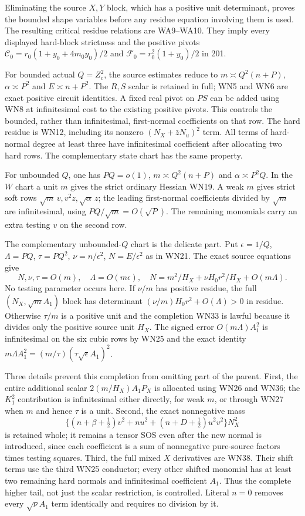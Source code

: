 Eliminating the source $X,Y$ block, which has a positive unit
determinant, proves the bounded shape variables before any residue
equation involving them is used.  The resulting critical residue
relations are WA9--WA10.  They imply every displayed hard-block
strictness and the positive pivots
$\mathcal C_0=r_0(1+y_0+4m_0y_0)/2$ and
$\mathcal F_0=r_0^2(1+y_0)/2$ in 201.

For bounded actual $Q=Z_c^2$, the source estimates reduce to
$m\asymp Q^2(n+P)$, $\alpha\asymp P^2$ and
$E\asymp n+P^2$.  The $R,S$ scalar is retained in full;
WN5 and WN6 are exact positive circuit identities.  A fixed real
pivot on $PS$ can be added using WN8 at infinitesimal cost to
the existing positive pivots.  This controls the bounded, rather
than infinitesimal, first-normal coefficients on that row.
The hard residue is WN12, including its nonzero
$(N_X+\bar zN_u)^2$ term.  All terms of hard-normal degree at
least three have infinitesimal coefficient after allocating two
hard rows.  The complementary state chart has the same property.

For unbounded $Q$, one has
$PQ=o(1)$, $m\asymp Q^2(n+P)$ and $\alpha\asymp P^2Q$.
In the $W$ chart a unit $m$ gives the strict ordinary Hessian
WN19.  A weak $m$ gives strict soft rows
$\sqrt m\,v,v^2z,\sqrt\alpha\,z$; the leading first-normal
coefficients divided by $\sqrt m$ are infinitesimal, using
$PQ/\sqrt m=O(\sqrt P)$.  The remaining monomials carry an
extra testing $v$ on the second row.

The complementary unbounded-$Q$ chart is the delicate part.
Put $\epsilon=1/Q$, $\Lambda=PQ$, $\tau=PQ^2$,
$\nu=n/\epsilon^2$, $N=E/\epsilon^2$ as in WN21.
The exact source equations give
\[
 N,\nu,\tau=O(m),\quad \Lambda=O(m\epsilon),\quad
 N=m^2/H_X+\nu H_0r^2/H_X+O(m\Lambda).               \tag{PA6}
\]
No testing parameter occurs here.  If $\nu/m$ has positive
residue, the full $(N_X,\sqrt m A_1)$ block has determinant
$(\nu/m)H_0r^2+O(\Lambda)>0$ in residue.  Otherwise
$\tau/m$ is a positive unit and the completion WN33 is lawful
because it divides only the positive source unit $H_X$.
The signed error $O(m\Lambda)A_1^2$ is infinitesimal on the
six cubic rows by WN25 and the exact identity
$m\Lambda A_1^2=(m/\tau)(\tau\sqrt\epsilon A_1)^2$.

Three details prevent this completion from omitting part of the
parent.  First, the entire additional scalar
$2(m/H_X)A_1P_X$ is allocated using WN26 and WN36; the
$K_1^2$ contribution is infinitesimal either directly, for weak
$m$, or through WN27 when $m$ and hence $\tau$ is a unit.
Second, the exact nonnegative mass
\[
 \{(n+\beta+\tfrac12)v^2+nu^2+
               (n+D+\tfrac12)u^2v^2\}N_X^2          \tag{PA7}
\]
is retained whole; it remains a tensor SOS even after the new
normal is introduced, since each coefficient is a sum of
nonnegative pure-source factors times testing squares.
Third, the full mixed $X$ derivatives are WN38.  Their shift
terms use the third WN25 conductor; every other shifted monomial
has at least two remaining hard normals and infinitesimal
coefficient $A_1$.  Thus the complete higher tail, not just the
scalar restriction, is controlled.  Literal $n=0$ removes every
$\sqrt\nu A_1$ term identically and requires no division by it.

